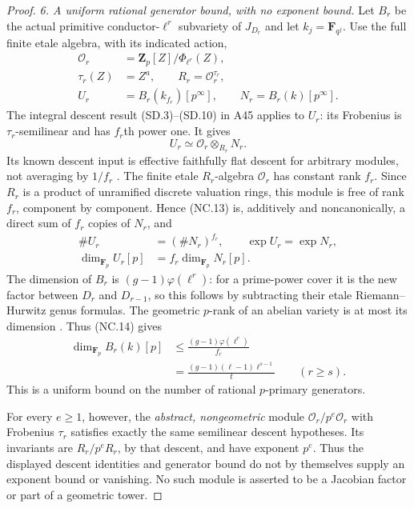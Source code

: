 \documentclass[11pt,a4paper]{article}
\begin{document}
\begin{proof}
\emph{6. A uniform rational generator bound, with no exponent bound.}
Let $B_r$ be the actual primitive conductor-$\ell^r$
subvariety of $J_{D_r}$ and let $k_j=\mathbf F_{q^j}$.
Use the full finite etale algebra, with its indicated action,
\[
\begin{aligned}
 \mathcal O_r&=\mathbf Z_p[Z]/\Phi_{\ell^r}(Z),\\
 \tau_r(Z)&=Z^a,\qquad R_r=\mathcal O_r^{\tau_r},\\
 U_r&=B_r(k_{f_r})[p^\infty],\qquad
 N_r=B_r(k)[p^\infty].
\end{aligned}
       \tag{NC.12}
\]
The integral descent result (SD.3)--(SD.10) in A45 applies
to $U_r$: its Frobenius is $\tau_r$-semilinear and has
$f_r$th power one. It gives
\[
                 U_r\simeq\mathcal O_r\otimes_{R_r}N_r.
       \tag{NC.13}
\]
Its known descent input is effective faithfully flat descent
for arbitrary modules, not averaging by $1/f_r$
\cite[Proposition~35.3.9, Tag~\texttt{023N}]{Stacks023N}.
The finite etale $R_r$-algebra $\mathcal O_r$ has constant
rank $f_r$. Since $R_r$ is a product of unramified discrete
valuation rings, this module is free of rank $f_r$, component
by component. Hence (NC.13) is, additively and noncanonically,
a direct sum of $f_r$ copies of $N_r$, and
\[
\begin{aligned}
 \#U_r&=(\#N_r)^{f_r},\qquad \exp U_r=\exp N_r,\\
 \dim_{\mathbf F_p}U_r[p]&=f_r\dim_{\mathbf F_p}N_r[p].
\end{aligned}
       \tag{NC.14}
\]
The dimension of $B_r$ is $(g-1)\varphi(\ell^r)$: for a
prime-power cover it is the new factor between $D_r$ and
$D_{r-1}$, so this follows by subtracting their etale
Riemann--Hurwitz genus formulas. The geometric $p$-rank
of an abelian variety is at most its dimension
\cite[Remark~8.5, the bound $r\le g$]{MilneAV}.
Thus (NC.14) gives
\[
\begin{aligned}
 \dim_{\mathbf F_p}B_r(k)[p]
 &\le \frac{(g-1)\varphi(\ell^r)}{f_r}\\
 &=\frac{(g-1)(\ell-1)\ell^{s-1}}{t}
 \qquad(r\ge s).
\end{aligned}
       \tag{NC.15}
\]
This is a uniform bound on the number of rational
$p$-primary generators.

For every $e\ge1$, however, the \emph{abstract, nongeometric}
module $\mathcal O_r/p^e\mathcal O_r$ with Frobenius
$\tau_r$ satisfies exactly the same semilinear descent
hypotheses. Its invariants are $R_r/p^eR_r$, by that descent,
and have exponent $p^e$. Thus the displayed descent identities
and generator bound do not by themselves supply an exponent
bound or vanishing. No such module is asserted to be a
Jacobian factor or part of a geometric tower.


\end{proof}
\end{document}
